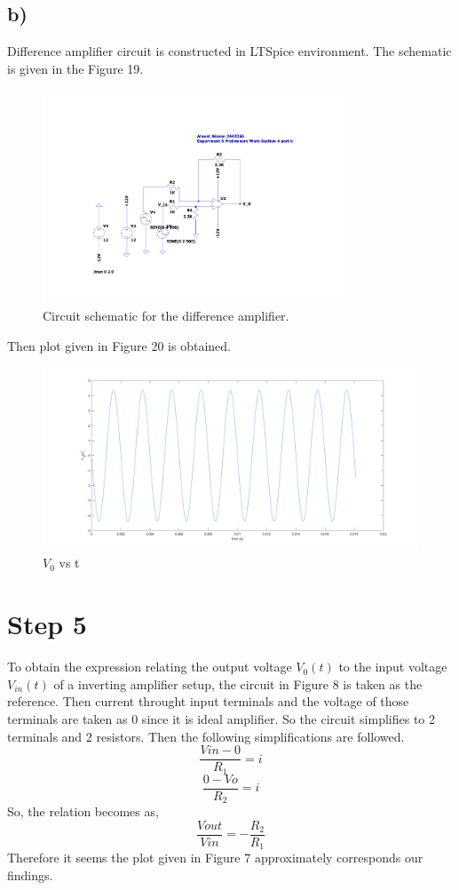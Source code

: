 \documentclass[letterpaper,12pt]{article}
\begin{document}
\subsection{b)}
Difference amplifier circuit is constructed in LTSpice environment. The schematic is given in the Figure 19.
\begin{figure}[H]
	\centering
   \includegraphics[width=0.8\textwidth]{difference_SCH.pdf}
   \caption{Circuit schematic for the difference amplifier.}
\end{figure} 
Then plot given in Figure 20 is obtained.
\begin{figure}[H]
	\centering
   \includegraphics[width=1\textwidth]{4b_vs_t.png}
   \caption{\(V_0\) vs t}
\end{figure}
\section{Step 5}
To obtain the expression relating the output voltage \(V_0 (t)\) to the input voltage \(V_{in} (t)\) of a inverting amplifier setup, the circuit in Figure 8 is taken as the reference. Then current throught input terminals and the voltage of those terminals are taken as 0 since it is ideal amplifier. So the circuit simplifies to 2 terminals and 2 resistors. Then the following simplifications are followed.
\[\frac{V{in} - 0 }{R_1} = i\]
\[\frac{0 - V{o} }{R_2} = i\]
So, the relation becomes as,
\[\frac{V{out}}{V{in}} = -\frac{R_2}{R_1}\]
Therefore it seems the plot given in Figure 7 approximately corresponds our findings.
\end{document}

